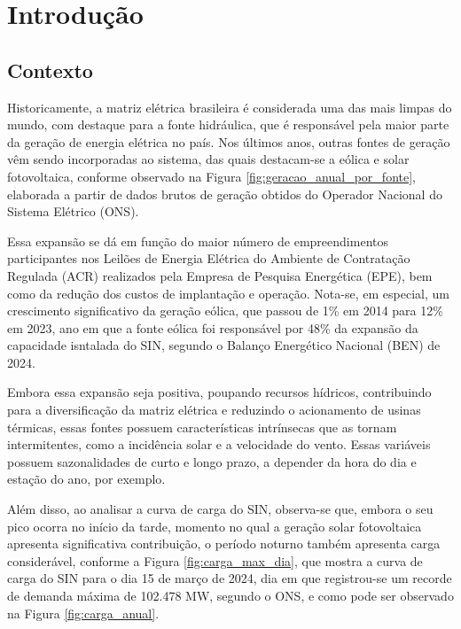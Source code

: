 \chapter{Introdução}
\sloppy																													%

\section{Contexto}
Historicamente, a matriz elétrica brasileira é considerada uma das mais limpas do mundo, com destaque para a fonte
hidráulica, que é responsável pela maior parte da geração de energia elétrica no país. Nos últimos anos, outras fontes
de geração vêm sendo incorporadas ao sistema, das quais destacam-se a eólica e solar fotovoltaica, conforme observado na
Figura \ref{fig:geracao_anual_por_fonte}, elaborada a partir de dados brutos de geração obtidos do Operador Nacional do
Sistema Elétrico (ONS). 

\begin{figure}[!ht]
	{}
	{}
\end{figure}

Essa expansão se dá em função do maior número de empreendimentos participantes nos Leilões de 
Energia Elétrica do Ambiente de Contratação Regulada (ACR) realizados pela Empresa de Pesquisa Energética (EPE), bem 
como da redução dos custos de implantação e operação. Nota-se, em especial, um crescimento significativo da geração 
eólica, que passou de 1\% em 2014 para 12\% em 2023, ano em que a fonte eólica foi responsável por 48\% da expansão da 
capacidade isntalada do SIN, segundo o Balanço Energético Nacional (BEN) de 2024. \cite{EPE2024}

Embora essa expansão seja positiva, poupando recursos hídricos, contribuindo para a diversificação da matriz elétrica e
reduzindo o acionamento de usinas térmicas, essas fontes possuem características intrínsecas que as tornam intermitentes,
como a incidência solar e a velocidade do vento. Essas variáveis possuem sazonalidades de curto e longo prazo, a 
depender da hora do dia e estação do ano, por exemplo.

Além disso, ao analisar a curva de carga do SIN, observa-se que, embora o seu pico ocorra no início da 
tarde, momento no qual a geração solar fotovoltaica apresenta significativa contribuição, o período noturno também 
apresenta carga considerável, conforme a Figura \ref{fig:carga_max_dia}, que mostra a curva de carga do SIN para o 
dia 15 de março de 2024, dia em que registrou-se um recorde de demanda máxima de 102.478 MW, segundo o ONS, e como pode 
ser observado na Figura \ref{fig:carga_anual}.

